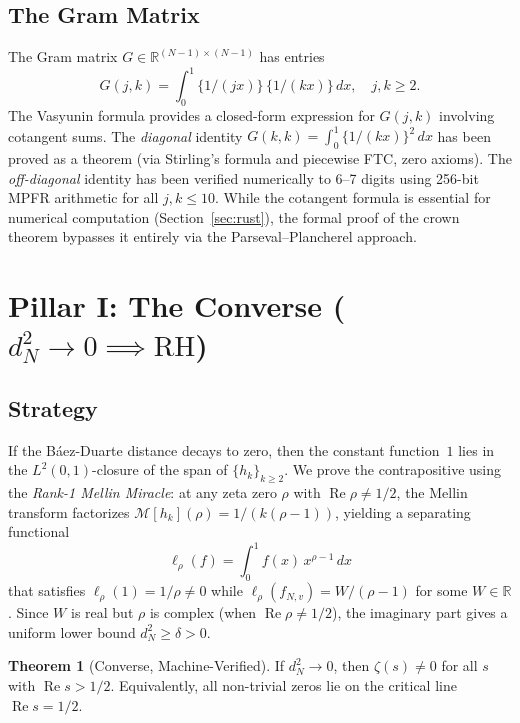 \documentclass[11pt,a4paper]{article}
\theoremstyle{definition}
\newtheorem{theorem}[definition]{Theorem}
\newcommand{\RH}{\mathrm{RH}}
\newcommand{\re}{\operatorname{Re}}
\newcommand{\RR}{\mathbb{R}}
\newcommand{\fract}[1]{\{#1\}}
\begin{document}
\subsection{The Gram Matrix}

The Gram matrix $G \in \RR^{(N-1) \times (N-1)}$ has entries
\[
  G(j,k) = \int_0^1 \fract{1/(jx)}\,\fract{1/(kx)}\,dx, \quad j,k \geq 2.
\]
The Vasyunin formula \cite{vasyunin1995} provides a closed-form expression
for $G(j,k)$ involving cotangent sums. The \emph{diagonal} identity
$G(k,k) = \int_0^1 \fract{1/(kx)}^2\,dx$ has been proved as a theorem
(via Stirling's formula and piecewise FTC, zero axioms).
The \emph{off-diagonal} identity has been verified numerically to
6--7 digits using 256-bit MPFR arithmetic for all $j, k \leq 10$.
While the cotangent formula is essential for numerical computation
(Section~\ref{sec:rust}), the formal proof of the crown theorem
bypasses it entirely via the Parseval--Plancherel approach.

\section{Pillar I: The Converse ($d_N^2 \to 0 \implies \RH$)}

\subsection{Strategy}

If the B\'aez-Duarte distance decays to zero, then the constant function~$1$
lies in the $L^2(0,1)$-closure of the span of $\{h_k\}_{k \geq 2}$.
We prove the contrapositive using the \emph{Rank-1 Mellin Miracle}: at any
zeta zero $\rho$ with $\re\rho \neq 1/2$, the Mellin transform factorizes
$\mathcal{M}[h_k](\rho) = 1/(k(\rho-1))$, yielding a separating functional
\[
  \ell_\rho(f) = \int_0^1 f(x)\,x^{\rho-1}\,dx
\]
that satisfies $\ell_\rho(1) = 1/\rho \neq 0$ while
$\ell_\rho(f_{N,v}) = W/(\rho-1)$ for some $W \in \RR$. Since $W$ is
real but $\rho$ is complex (when $\re\rho \neq 1/2$), the imaginary part
gives a uniform lower bound $d_N^2 \geq \delta > 0$.

\begin{theorem}[Converse, Machine-Verified]
\label{thm:converse}
If $d_N^2 \to 0$, then $\zeta(s) \neq 0$ for all $s$ with $\re s > 1/2$.
Equivalently, all non-trivial zeros lie on the critical line $\re s = 1/2$.
\end{theorem}
\end{document}
